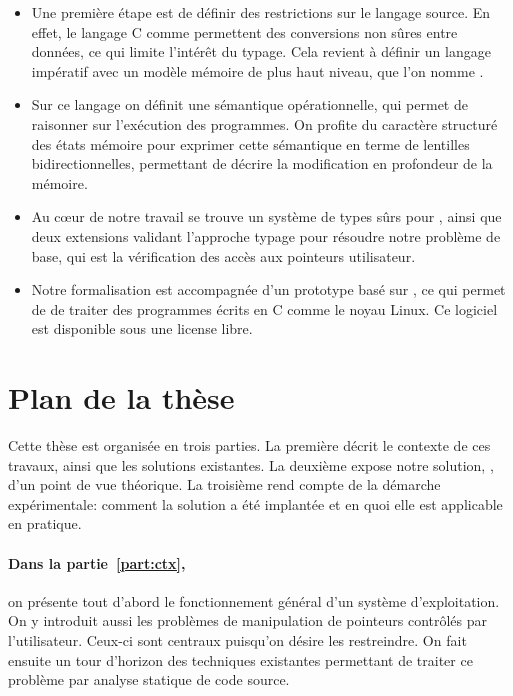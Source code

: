 \begin{itemize}

\item
Une première étape est de définir des restrictions sur le langage source. En
effet, le langage C comme \newspeak permettent des conversions non sûres entre
données, ce qui limite l'intérêt du typage. Cela revient à définir un
langage impératif avec un modèle mémoire de plus haut niveau, que l'on nomme
\langname.

\item
Sur ce langage on définit une sémantique opérationnelle, qui permet de raisonner
sur l'exécution des programmes. On profite du caractère structuré des états
mémoire pour exprimer cette sémantique en terme de lentilles
bidirectionnelles, permettant de décrire la modification en profondeur de la
mémoire.

\item
Au cœur de notre travail se trouve un système de types sûrs pour \langname,
ainsi que deux extensions validant l'approche typage pour résoudre notre
problème de base, qui est la vérification des accès aux pointeurs utilisateur.

\item
Notre formalisation est accompagnée d'un prototype basé sur \newspeak, ce qui
permet de de traiter des programmes écrits en C comme le noyau Linux. Ce
logiciel est disponible sous une license libre.

\end{itemize}

\section{Plan de la thèse}

Cette thèse est organisée en trois parties. La première décrit le contexte de
ces travaux, ainsi que les solutions existantes. La deuxième expose notre
solution, \langname, d'un point de vue théorique. La troisième rend compte de la
démarche expérimentale: comment la solution a été implantée et en quoi elle est
applicable en pratique.

\paragraph{Dans la partie~\ref{part:ctx},} on présente tout d'abord le
fonctionnement général d'un système d'exploitation. On y introduit aussi les
problèmes de manipulation de pointeurs contrôlés par l'utilisateur. Ceux-ci sont
centraux puisqu'on désire les restreindre. On fait ensuite un tour d'horizon des
techniques existantes permettant de traiter ce problème par analyse statique de
code source.

